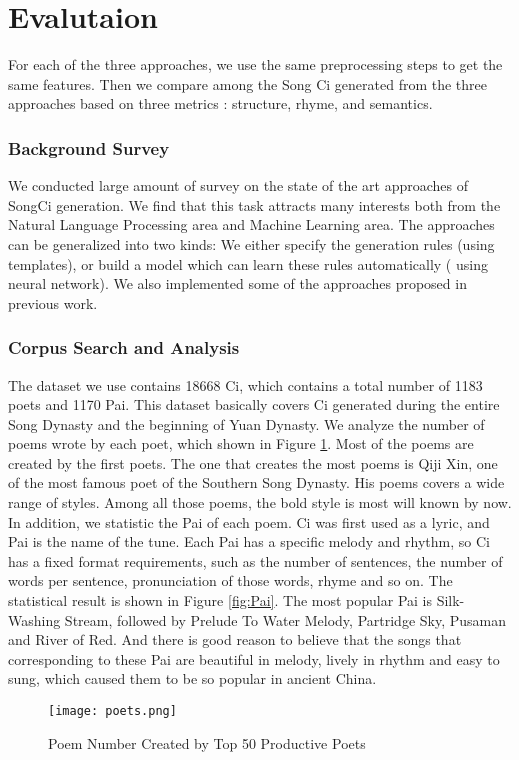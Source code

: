 \section{Evalutaion}
For each of the three approaches, we use the same preprocessing steps to get the same features. Then we compare among the  Song Ci generated from the three approaches based on three metrics : structure, rhyme, and semantics. 

\subsubsection{Background Survey}
%
We conducted large amount of survey on the state of the art approaches of SongCi generation.
%
We find that this task attracts many interests both from the Natural Language Processing area and Machine Learning area.
%
The approaches can be generalized into two kinds:  We either specify the generation rules (using templates), or build a model which can learn these rules automatically ( using neural network).
%
We also implemented some of the approaches proposed in previous work.
%
%
%
\subsubsection {Corpus Search and Analysis}
%
The dataset we use contains 18668 Ci, which contains a total number of 1183 poets and 1170 Pai. This dataset basically covers Ci generated during the entire Song Dynasty and the beginning of Yuan Dynasty. We analyze the number of poems wrote by each poet, which shown in Figure \ref{fig:poet}. Most of the poems are created by the first poets. The one that creates the most poems is Qiji Xin, one of the most famous poet of the Southern Song Dynasty. His poems covers a wide range of styles. Among all those poems, the bold style is most will known by now. In addition, we statistic the Pai of each poem. Ci was first used as a lyric, and Pai is the name of the tune. Each Pai has a specific melody and rhythm, so Ci has a fixed format requirements, such as the number of sentences, the number of words per sentence, pronunciation of those words, rhyme and so on. The statistical result is shown in Figure \ref{fig:Pai}. The most popular Pai is Silk-Washing Stream, followed by Prelude To Water Melody, Partridge Sky, Pusaman and River of Red. And there is good reason to believe that the songs that corresponding to these Pai are beautiful in melody, lively in rhythm and easy to sung, which caused them to be so popular in ancient China.
\begin{figure}[htbp]
	\centering
	\texttt{[image: poets.png]}
	\caption{Poem Number Created by Top 50 Productive Poets}
	\label{fig:poet}
\end{figure}

